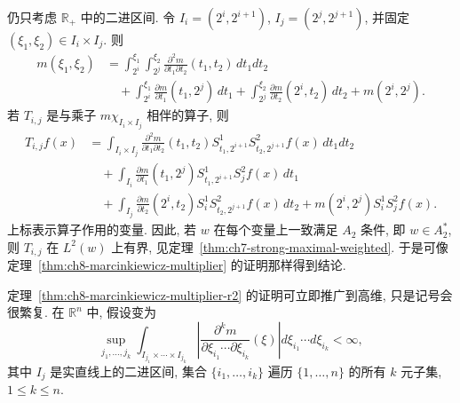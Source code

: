 \begin{Proof}
仍只考虑 $\mathbb R_+$ 中的二进区间. 令 $I_i=(2^i,2^{i+1})$, $I_j=(2^j,2^{j+1})$, 并固定 $(\xi_1,\xi_2)\in I_i\times I_j$. 则
\[
\begin{aligned}
 m(\xi_1,\xi_2)
 &=\int_{2^i}^{\xi_1}\int_{2^j}^{\xi_2}
 \frac{\partial^2m}{\partial t_1\partial t_2}(t_1,t_2)\,dt_1dt_2\\
 &\quad+\int_{2^i}^{\xi_1}\frac{\partial m}{\partial t_1}(t_1,2^j)\,dt_1
 +\int_{2^j}^{\xi_2}\frac{\partial m}{\partial t_2}(2^i,t_2)\,dt_2
 +m(2^i,2^j).
\end{aligned}
\]
若 $T_{i,j}$ 是与乘子 $m\chi_{I_i\times I_j}$ 相伴的算子, 则
\[
\begin{aligned}
 T_{i,j}f(x)
 &=\int_{I_i\times I_j}\frac{\partial^2m}{\partial t_1\partial t_2}(t_1,t_2)
 S_{t_1,2^{i+1}}^1S_{t_2,2^{j+1}}^2f(x)\,dt_1dt_2\\
 &\quad+\int_{I_i}\frac{\partial m}{\partial t_1}(t_1,2^j)S_{t_1,2^{i+1}}^1S_j^2f(x)\,dt_1\\
 &\quad+\int_{I_j}\frac{\partial m}{\partial t_2}(2^i,t_2)S_i^1S_{t_2,2^{j+1}}^2f(x)\,dt_2
 +m(2^i,2^j)S_i^1S_j^2f(x).
\end{aligned}
\]
上标表示算子作用的变量. 因此, 若 $w$ 在每个变量上一致满足 $A_2$ 条件, 即 $w\in A_2^*$, 则 $T_{i,j}$ 在 $L^2(w)$ 上有界, 见定理~\ref{thm:ch7-strong-maximal-weighted}. 于是可像定理~\ref{thm:ch8-marcinkiewicz-multiplier} 的证明那样得到结论.
\end{Proof}

\hypertarget{chapter-08-page-180}{}
定理~\ref{thm:ch8-marcinkiewicz-multiplier-r2} 的证明可立即推广到高维, 只是记号会很繁复. 在 $\mathbb R^n$ 中, 假设变为
\[
 \sup_{j_1,\ldots,j_k}
 \int_{I_{j_1}\times\cdots\times I_{j_k}}
 \left|\frac{\partial^km}{\partial\xi_{i_1}\cdots\partial\xi_{i_k}}(\xi)\right|
 d\xi_{i_1}\cdots d\xi_{i_k}<\infty,
\]
其中 $I_j$ 是实直线上的二进区间, 集合 $\{i_1,\ldots,i_k\}$ 遍历 $\{1,\ldots,n\}$ 的所有 $k$ 元子集, $1\le k\le n$.
